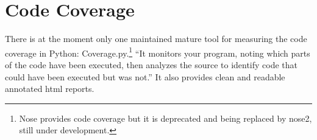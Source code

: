 \section{Code Coverage}

There is at the moment only one maintained mature tool for measuring the code
coverage in Python: Coverage.py.\footnote{Nose provides code coverage but it is
deprecated and being replaced by nose2, still under development.} ``It monitors
your program, noting which parts of the code have been executed, then analyzes
the source to identify code that could have been executed but was
not.''\cite{coveragePY} It also provides clean and readable annotated html
reports.
